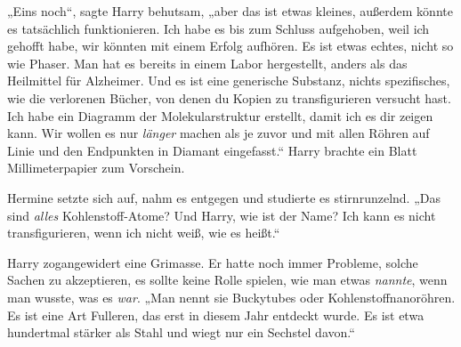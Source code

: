„Eins noch“, sagte Harry behutsam, „aber das ist etwas kleines, außerdem könnte es tatsächlich funktionieren. Ich habe es bis zum Schluss aufgehoben, weil ich gehofft habe, wir könnten mit einem Erfolg aufhören. Es ist etwas echtes, nicht so wie Phaser. Man hat es bereits in einem Labor hergestellt, anders als das Heilmittel für Alzheimer. Und es ist eine generische Substanz, nichts spezifisches, wie die verlorenen Bücher, von denen du Kopien zu transfigurieren versucht hast. Ich habe ein Diagramm der Molekularstruktur erstellt, damit ich es dir zeigen kann. Wir wollen es nur \emph{länger} machen als je zuvor und mit allen Röhren auf Linie und den Endpunkten in Diamant eingefasst.“ Harry brachte ein Blatt Millimeterpapier zum Vorschein.

Hermine setzte sich auf, nahm es entgegen und studierte es stirnrunzelnd. „Das sind \emph{alles} Kohlenstoff-Atome? Und Harry, wie ist der Name? Ich kann es nicht transfigurieren, wenn ich nicht weiß, wie es heißt.“

Harry zogangewidert eine Grimasse. Er hatte noch immer Probleme, solche Sachen zu akzeptieren, es sollte keine Rolle spielen, wie man etwas \emph{nannte}, wenn man wusste, was es \emph{war}. „Man nennt sie Buckytubes oder Kohlenstoffnanoröhren. Es ist eine Art Fulleren, das erst in diesem Jahr entdeckt wurde. Es ist etwa hundertmal stärker als Stahl und wiegt nur ein Sechstel davon.“

